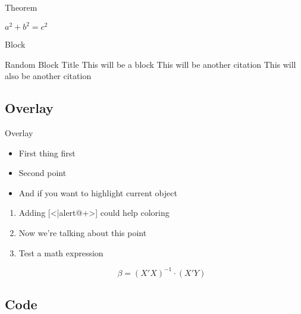 \documentclass[pdf]{beamer}
\begin{document}
\begin{frame}{Theorem}
    \begin{Theorem} %
    
        $a^2 + b^2 = c^2$
    
    \end{Theorem}
\end{frame}


\begin{frame}{Block}
    
    \begin{block}{Random Block Title}
    This will be a block \cite{10.1257/aer.20200451}
    This will be another citation \cite{10.1257/aer.20190553}
    This will also be another citation \cite{Adler:1998:MDL}
    \end{block}
    
\end{frame}

\subsection{Overlay}

\begin{frame}{Overlay}

    \begin{itemize}[<+->]
        \item First thing first
        \item Second point 
        \item And if you want to highlight current object
    \end{itemize}
    
    \begin{enumerate}[<+-|alert@+>]
        \item Adding [<|alert@+>] could help coloring
        \item Now we're talking about this point
        \item Test a math expression
        
        \begin{equation*}
            \beta = (X'X)^{-1} \cdot (X'Y)
        \end{equation*}
        
    \end{enumerate}
    
    
\end{frame}

\subsection{Code}
\end{document}
